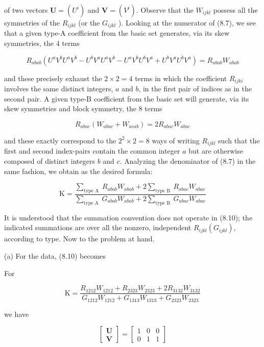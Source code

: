 \documentclass[10pt]{article}
\begin{document}
of two vectors $\mathbf{U}=\left(U^{i}\right)$ and $\mathbf{V}=\left(V^{i}\right)$. Observe that the $W_{i j k l}$ possess all the symmetries of the $R_{i j k l}$ (or the $G_{i j k l}$ ). Looking at the numerator of (8.7), we see that a given type-A coefficient from the basic set generates, via its skew symmetries, the 4 terms

$$
R_{a b a b}\left(U^{a} V^{b} U^{a} V^{b}-U^{b} V^{a} U^{a} V^{b}-U^{a} V^{b} U^{b} V^{a}+U^{b} V^{a} U^{b} V^{a}\right)=R_{a b a b} W_{a b a b}
$$

and these precisely exhaust the $2 \times 2=4$ terms in which the coefficient $R_{i j k i}$ involves the same distinct integers, $a$ and $b$, in the first pair of indices as in the second pair. A given type-B coefficient from the basic set will generate, via its skew symmetries and block symmetry, the 8 terms

$$
R_{a b a c}\left(W_{a b a c}+W_{a c a b}\right)=2 R_{a b a c} W_{a b a c}
$$

and these exactly correspond to the $2^{2} \times 2=8$ ways of writing $R_{i j k l}$ such that the first and second index-pairs contain the common integer $a$ but are otherwise composed of distinct integers $b$ and $c$. Analyzing the denominator of (8.7) in the same fashion, we obtain as the desired formula:


\begin{equation*}
\mathrm{K}=\frac{\sum_{\text {type A }} R_{a b a b} W_{a b a b}+2 \sum_{\text {type B }} R_{a b a c} W_{a b a c}}{\sum_{\text {type A }} G_{a b a b} W_{a b a b}+2 \sum_{\text {type B }} G_{a b a c} W_{a b a c}} \tag{8.10}
\end{equation*}


It is understood that the summation convention does not operate in (8.10); the indicated summations are over all the nonzero, independent $R_{i j k l}\left(G_{i j k l}\right)$, according to type. Now to the problem at hand.

(a) For the data, (8.10) becomes

For

$$
\mathrm{K}=\frac{R_{1212} W_{1212}+R_{2323} W_{2323}+2 R_{3132} W_{3132}}{G_{1212} W_{1212}+G_{1313} W_{1313}+G_{2323} W_{2323}}
$$

we have

$$
\left[\begin{array}{l}
\mathbf{U} \\
\mathbf{V}
\end{array}\right]=\left[\begin{array}{lll}
1 & 0 & 0 \\
0 & 1 & 1
\end{array}\right]
$$
\end{document}
